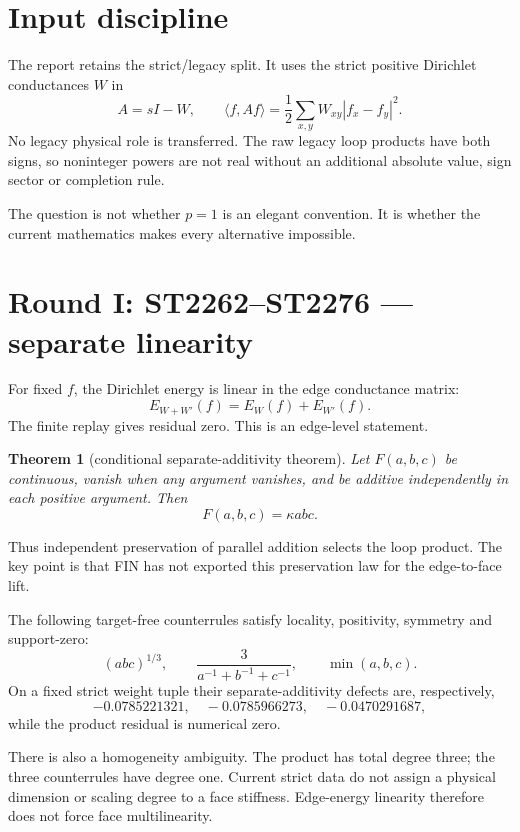 \documentclass[11pt,a4paper]{article}
\newtheorem{theorem}{Theorem}\newtheorem{proposition}{Proposition}
\begin{document}
\tableofcontents\newpage

\section{Input discipline}

The report retains the strict/legacy split.  It uses the strict positive
Dirichlet conductances \(W\) in
\[
 A=sI-W,\qquad
 \langle f,Af\rangle=\frac12\sum_{x,y}W_{xy}|f_x-f_y|^2.
\]
No legacy physical role is transferred.  The raw legacy loop products have
both signs, so noninteger powers are not real without an additional absolute
value, sign sector or completion rule.

The question is not whether \(p=1\) is an elegant convention.  It is whether
the current mathematics makes every alternative impossible.

\section{Round I: ST2262--ST2276 --- separate linearity}

For fixed \(f\), the Dirichlet energy is linear in the edge conductance matrix:
\[
 E_{W+W'}(f)=E_W(f)+E_{W'}(f).
\]
The finite replay gives residual zero.  This is an edge-level statement.

\begin{theorem}[conditional separate-additivity theorem]
Let \(F(a,b,c)\) be continuous, vanish when any argument vanishes, and be
additive independently in each positive argument.  Then
\[
 F(a,b,c)=\kappa abc.
\]
\end{theorem}

Thus independent preservation of parallel addition selects the loop product.
The key point is that FIN has not exported this preservation law for the
edge-to-face lift.

The following target-free counterrules satisfy locality, positivity, symmetry
and support-zero:
\[
 (abc)^{1/3},\qquad
 \frac3{a^{-1}+b^{-1}+c^{-1}},\qquad
 \min(a,b,c).
\]
On a fixed strict weight tuple their separate-additivity defects are,
respectively,
\[
 -0.0785221321,\quad -0.0785966273,\quad -0.0470291687,
\]
while the product residual is numerical zero.

There is also a homogeneity ambiguity.  The product has total degree three;
the three counterrules have degree one.  Current strict data do not assign a
physical dimension or scaling degree to a face stiffness.  Edge-energy
linearity therefore does not force face multilinearity.
\end{document}

